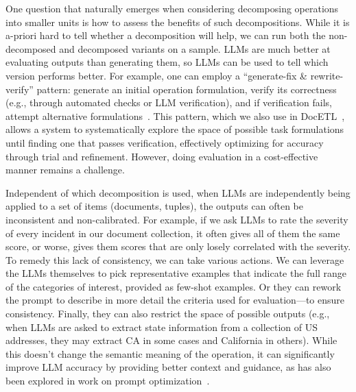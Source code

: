 One question that naturally emerges when considering
decomposing operations into smaller units
is how to assess the benefits of such decompositions.
While it is a-priori hard to tell whether
a decomposition will help, we can run
both the non-decomposed and decomposed
variants on a sample. 
LLMs are much better at evaluating outputs
than generating them, so LLMs can be used
to tell which version performs better.
For example, 
one can employ a ``generate-fix \& rewrite-verify'' pattern: generate an initial operation formulation, 
verify its correctness (e.g., through automated checks or LLM verification), and if verification fails, attempt alternative formulations~\cite{chung2025long}. 
This pattern, which we also use in DocETL~\cite{shankar2024docetl}, allows a system to systematically explore the space of possible task formulations until finding one that passes verification, effectively optimizing for accuracy through trial and refinement.
However, doing evaluation in a cost-effective manner remains
a challenge. 


Independent of which decomposition is used,
when LLMs are independently being applied
to a set of items (documents, tuples),
the outputs can often be
inconsistent and non-calibrated.
For example, if we ask LLMs to rate
the severity of every incident
in our document collection,
it often gives all of them the same score,
or worse, gives them scores that
are only losely correlated with the severity.
To remedy this lack of consistency,
we can take various actions.
We can leverage the LLMs themselves to pick 
representative examples that indicate
the full range of the categories of interest, provided
as few-shot examples.
Or they can rework the prompt to describe in more detail
the criteria used for evaluation---to ensure consistency.
Finally, they can also
restrict the space of possible outputs
(e.g., when LLMs are asked to extract state information
from a collection of US addresses, they may extract CA in some
cases and California in others).
While this doesn't change the semantic meaning of the operation, it can significantly improve LLM accuracy by providing better context and guidance, as has
also been explored in work on prompt optimization~\cite{khattab2023dspy}.


